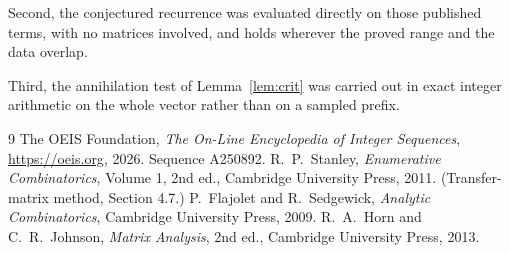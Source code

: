 \documentclass[11pt,a4paper]{article}
\theoremstyle{plain}
\theoremstyle{definition}
\begin{document}
Second, the conjectured recurrence was evaluated directly on those published terms, with no
matrices involved, and holds wherever the proved range and the data overlap.

Third, the annihilation test of Lemma~\ref{lem:crit} was carried out in exact integer
arithmetic on the whole vector rather than on a sampled prefix.

\begin{thebibliography}{9}
 The OEIS Foundation, \emph{The On-Line Encyclopedia of Integer
Sequences}, \url{https://oeis.org}, 2026. Sequence A250892.
 R.~P.~Stanley, \emph{Enumerative Combinatorics}, Volume 1, 2nd ed.,
Cambridge University Press, 2011. (Transfer-matrix method, Section 4.7.)
 P.~Flajolet and R.~Sedgewick, \emph{Analytic Combinatorics}, Cambridge
University Press, 2009.
 R.~A.~Horn and C.~R.~Johnson, \emph{Matrix Analysis}, 2nd ed., Cambridge
University Press, 2013.
\end{thebibliography}
\end{document}
